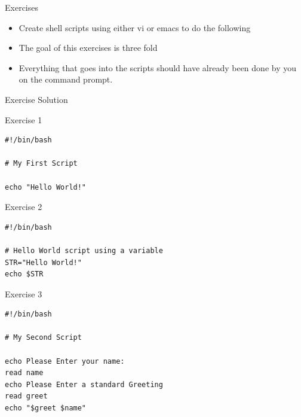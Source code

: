 \documentclass[slidestop,mathserif,compress,xcolor=svgnames]{beamer}
\newenvironment{eblock}[0]
{
\begin{beamerboxesrounded}[upper=uppercol2,lower=lowercol2,shadow=true]}
{\end{beamerboxesrounded}}
\begin{document}
\begin{frame}{\small Exercises}
  \begin{itemize}
    \item Create shell scripts using either vi or emacs to do the following
    \item The goal of this exercises is three fold
    \item Everything that goes into the scripts should have already been done by you on the command prompt. 
  \end{itemize}
\end{frame}

\begin{frame}[fragile]{\small Exercise Solution}
  \vspace{-0.2cm}
  \begin{eblock}{Exercise 1}
  {\tiny
    \begin{verbatim}
#!/bin/bash

# My First Script

echo "Hello World!"
      \end{verbatim}
  }
  \end{eblock}
  \begin{eblock}{Exercise 2}
  {\tiny
    \begin{verbatim}
#!/bin/bash

# Hello World script using a variable
STR="Hello World!"
echo $STR
    \end{verbatim}
  }
  \end{eblock}
  \begin{eblock}{Exercise 3}
    {\tiny
    \begin{verbatim}
#!/bin/bash

# My Second Script

echo Please Enter your name:
read name
echo Please Enter a standard Greeting
read greet
echo "$greet $name"
    \end{verbatim}
    }
  \end{eblock}
\end{frame}
\end{document}
